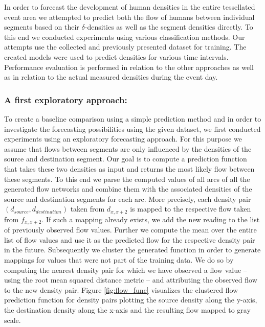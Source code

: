 \documentclass[12pt,a4paper,twoside,openright]{book}
\begin{document}
In order to forecast the development of human densities in the entire tessellated event area we attempted to predict both the flow of humans between individual segments based on their $\delta$-densities as well as the segment densities directly.
%
To this end we conducted experiments using various classification methods.
%
Our attempts use the collected and previously presented dataset for training.
%
The created models were used to predict densities for various time intervals.
%
Performance evaluation is performed in relation to the other approaches as well as in relation to the actual measured densities during the event day.

\subsubsection{A first exploratory approach:}
\label{subsubsec:naive-exploratory-approach}

To create a baseline comparison using a simple prediction method and in order to investigate the forecasting possibilities using the given dataset, we first conducted experiments using an exploratory forecasting approach.
%
For this purpose we assume that flows between segments are only influenced by the densities of the source and destination segment.
%
Our goal is to compute a prediction function that takes these two densities as input and returns the most likely flow between these segments.
%
To this end we parse the computed values of all arcs of all the generated flow networks and combine them with the associated densities of the source and destination segments for each arc.
%
More precisely, each density pair $(d_{source}, d_{destination})$ taken from $d_{x,x+2}$ is mapped to the respective flow taken from $f_{x,x+2}$.
%
If such a mapping already exists, we add the new reading to the list of previously observed flow values.
%
Further we compute the mean over the entire list of flow values and use it as the predicted flow for the respective density pair in the future.
%
Subsequently we cluster the generated function in order to generate mappings for values that were not part of the training data.
%
We do so by computing the nearest density pair for which we have observed a flow value -- using the root mean squared distance metric -- and attributing the observed flow to the new density pair.
%
Figure \ref{fig:flow_func} visualizes the clustered flow prediction function for density pairs plotting the source density along the y-axis, the destination density along the x-axis and the resulting flow mapped to gray scale.
\end{document}
